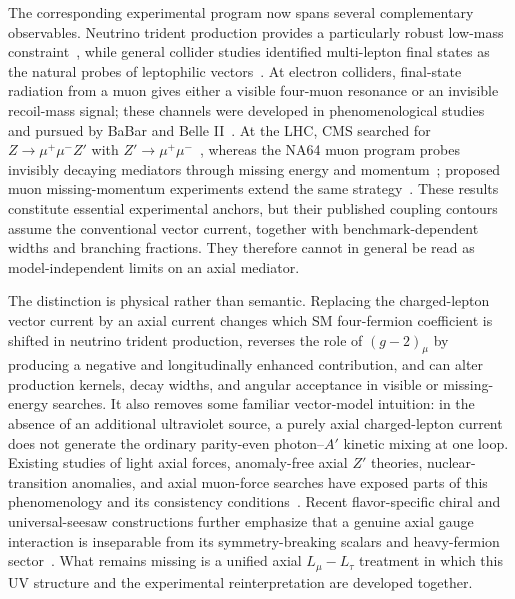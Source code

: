 \documentclass[onecolumn, aps, nofootinbib, prd, preprint, floats, floatfix, amsmath, amssymb, superscriptaddress, preprintnumbers]{revtex4-1}
\begin{document}
The corresponding experimental program now spans several complementary observables. Neutrino trident production provides a particularly robust low-mass constraint~\cite{Altmannshofer:2014pba}, while general collider studies identified multi-lepton final states as the natural probes of leptophilic vectors~\cite{delAguila:2014soa}. At electron colliders, final-state radiation from a muon gives either a visible four-muon resonance or an invisible recoil-mass signal; these channels were developed in phenomenological studies~\cite{Araki:2017wyg,Brown:2024jah} and pursued by BaBar and Belle II~\cite{BaBar:2016sci,Belle-II:2019qfb,Belle-II:2022yaw,Belle-II:2024wtd}. At the LHC, CMS searched for $Z\to\mu^+\mu^-Z'$ with $Z'\to\mu^+\mu^-$~\cite{CMS:2018yxg}, whereas the NA64 muon program probes invisibly decaying mediators through missing energy and momentum~\cite{NA64:2024klw}; proposed muon missing-momentum experiments extend the same strategy~\cite{Kahn:2018cqs}. These results constitute essential experimental anchors, but their published coupling contours assume the conventional vector current, together with benchmark-dependent widths and branching fractions. They therefore cannot in general be read as model-independent limits on an axial mediator.

The distinction is physical rather than semantic. Replacing the charged-lepton vector current by an axial current changes which SM four-fermion coefficient is shifted in neutrino trident production, reverses the role of $(g-2)_\mu$ by producing a negative and longitudinally enhanced contribution, and can alter production kernels, decay widths, and angular acceptance in visible or missing-energy searches. It also removes some familiar vector-model intuition: in the absence of an additional ultraviolet source, a purely axial charged-lepton current does not generate the ordinary parity-even photon--$A'$ kinetic mixing at one loop. Existing studies of light axial forces, anomaly-free axial $Z'$ theories, nuclear-transition anomalies, and axial muon-force searches have exposed parts of this phenomenology and its consistency conditions~\cite{Kahn:2016vjr,Ismail:2016tod,Kozaczuk:2016nma,Hicyilmaz:2022owb,Batell:2011qq,Davoudiasl:2012ag,Fayet:2020bmb,Baruch:2022esd,Fayet:2024ddk}. Recent flavor-specific chiral and universal-seesaw constructions further emphasize that a genuine axial gauge interaction is inseparable from its symmetry-breaking scalars and heavy-fermion sector~\cite{Prajapati:2026tfv,Dutta:2026dnf}. What remains missing is a unified axial $L_\mu-L_\tau$ treatment in which this UV structure and the experimental reinterpretation are developed together.
\end{document}

